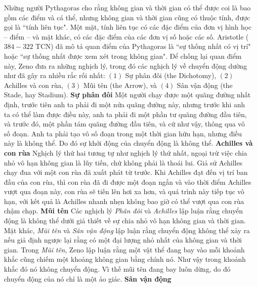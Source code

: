 \begin{multicols}{2}
	\vskip 0.1cm
	Những người Pythagoras cho rằng không gian và thời gian có thể được coi là bao gồm các điểm và cá thể, nhưng không gian và thời gian cũng có thuộc tính, được gọi là ``tính liên tục". 
	Một mặt, tính liên tục có các đặc điểm của đơn vị hình học -- điểm -- và mặt khác, có các đặc điểm của các đơn vị số hoặc các số.
	Aristotle ($384-322$ TCN) đã mô tả quan điểm của Pythagoras là ``sự thống nhất có vị trí" hoặc ``sự thống nhất được xem xét trong không gian". 
	Để chống lại quan điểm này, Zeno đưa ra những nghịch lý, trong đó các nghịch lý về chuyển động dường như đã gây ra nhiều rắc rối nhất:
	\vskip 0.1cm
	$(1)$ Sự phân đôi (the Dichotomy), 
	\vskip 0.1cm
	$(2)$ Achilles và con rùa, 
	\vskip 0.1cm
	$(3)$ Mũi tên (the Arrow), và 
	\vskip 0.1cm
	$(4)$ Sân vận động (the Stade, hay Stadium).
	\vskip 0.1cm
	\textbf{\color{lichsutoanhoc}Sự phân đôi}
	\vskip 0.1cm
	Một người chạy được một quãng đường nhất định, trước tiên anh ta phải đi một nửa quãng đường này, nhưng trước khi anh ta có thể làm được điều này, anh ta phải đi một phần tư quãng đường đầu tiên, và trước đó, một phần tám quãng đường đầu tiên, và cứ như vậy, thông qua vô số đoạn.  Anh ta phải tạo vô số đoạn trong một thời gian hữu hạn, nhưng điều này là không thể. Do đó sự khởi động của chuyển động là không thể.
	\vskip 0.1cm
	\textbf{\color{lichsutoanhoc}Achilles và con rùa}
	\vskip 0.1cm
	Nghịch lý thứ hai tương tự như nghịch lý thứ nhất, ngoại trừ việc chia nhỏ vô hạn không gian là lũy tiến, chứ không phải là thoái lui. Giả sử Achilles chạy đua với một con rùa đã xuất phát từ trước. Khi Achilles đạt đến vị trí ban đầu của con rùa, thì con rùa đã đi được một đoạn ngắn và vào thời điểm Achilles vượt qua đoạn này, con rùa sẽ tiến lên hơi xa hơn, và quá trình này tiếp tục vô hạn, với kết quả là Achilles nhanh nhẹn không bao giờ có thể vượt qua con rùa chậm chạp.
	\vskip 0.1cm
	\textbf{\color{lichsutoanhoc}Mũi tên}
	\vskip 0.05cm
	Các nghịch lý \textit{Phân đôi} và \textit{Achilles} lập luận rằng chuyển động là không thể dưới giả thiết về sự chia nhỏ vô hạn không gian và thời gian. Mặt khác, \textit{Mũi tên} và \textit{Sân vận động} lập luận rằng chuyển động không thể xảy ra nếu giả định ngược lại rằng có một đại lượng nhỏ nhất của không gian và thời gian. Trong \textit{Mũi tên}, Zeno lập luận rằng một vật thể đang bay vào mỗi khoảnh khắc cũng chiếm một khoảng không gian bằng chính nó. Như vậy trong khoảnh khắc đó nó không chuyển động. Vì thế mũi tên đang bay luôn dừng, do đó chuyển động của nó chỉ là một ảo giác.
	\vskip 0.05cm
	\textbf{\color{lichsutoanhoc}Sân vận động}

\end{multicols}
